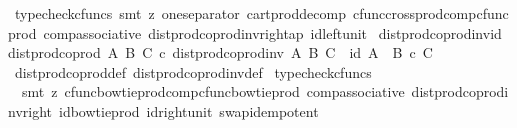 \begin{isabellebody}
\isamarkupfalse%
\ {\isacharparenleft}{\kern0pt}typecheck{\isacharunderscore}{\kern0pt}cfuncs{\isacharcomma}{\kern0pt}\ smt\ {\isacharparenleft}{\kern0pt}z{}{\isacharparenright}{\kern0pt}\ one{\isacharunderscore}{\kern0pt}separator\ cart{\isacharunderscore}{\kern0pt}prod{\isacharunderscore}{\kern0pt}decomp\ cfunc{\isacharunderscore}{\kern0pt}cross{\isacharunderscore}{\kern0pt}prod{\isacharunderscore}{\kern0pt}comp{\isacharunderscore}{\kern0pt}cfunc{\isacharunderscore}{\kern0pt}prod\ comp{\isacharunderscore}{\kern0pt}associative{}\ dist{\isacharunderscore}{\kern0pt}prod{\isacharunderscore}{\kern0pt}coprod{\isacharunderscore}{\kern0pt}inv{}{\isacharunderscore}{\kern0pt}right{\isacharunderscore}{\kern0pt}ap\ id{\isacharunderscore}{\kern0pt}left{\isacharunderscore}{\kern0pt}unit{}{\isacharparenright}{\kern0pt}%
\endisatagproof
{\isafoldproof}%
%
\isadelimproof
\isanewline
%
\endisadelimproof
\isanewline
{}\isamarkupfalse%
\ dist{\isacharunderscore}{\kern0pt}prod{\isacharunderscore}{\kern0pt}coprod{}{\isacharunderscore}{\kern0pt}inv{}{\isacharunderscore}{\kern0pt}id{\isacharcolon}{\kern0pt}\isanewline
{\isachardoublequoteopen}dist{\isacharunderscore}{\kern0pt}prod{\isacharunderscore}{\kern0pt}coprod{}\ A\ B\ C\ {\isasymcirc}\isactrlsub c\ dist{\isacharunderscore}{\kern0pt}prod{\isacharunderscore}{\kern0pt}coprod{\isacharunderscore}{\kern0pt}inv{}\ A\ B\ C\ {\isacharequal}{\kern0pt}\ id\ {\isacharparenleft}{\kern0pt}{\isacharparenleft}{\kern0pt}A\ {\isasymCoprod}\ B{\isacharparenright}{\kern0pt}\ {\isasymtimes}\isactrlsub c\ C{\isacharparenright}{\kern0pt}{\isachardoublequoteclose}\isanewline
%
\isadelimproof
\ \ %
\endisadelimproof
%
\isatagproof
{}\isamarkupfalse%
\ dist{\isacharunderscore}{\kern0pt}prod{\isacharunderscore}{\kern0pt}coprod{}{\isacharunderscore}{\kern0pt}def\ dist{\isacharunderscore}{\kern0pt}prod{\isacharunderscore}{\kern0pt}coprod{\isacharunderscore}{\kern0pt}inv{}{\isacharunderscore}{\kern0pt}def\ \isamarkupfalse%
{\isacharparenleft}{\kern0pt}{\isacharminus}{\kern0pt}{\isacharcomma}{\kern0pt}typecheck{\isacharunderscore}{\kern0pt}cfuncs{\isacharcomma}{\kern0pt}\isanewline
\ \ smt\ {\isacharparenleft}{\kern0pt}z{}{\isacharparenright}{\kern0pt}\ cfunc{\isacharunderscore}{\kern0pt}bowtie{\isacharunderscore}{\kern0pt}prod{\isacharunderscore}{\kern0pt}comp{\isacharunderscore}{\kern0pt}cfunc{\isacharunderscore}{\kern0pt}bowtie{\isacharunderscore}{\kern0pt}prod\ comp{\isacharunderscore}{\kern0pt}associative{}\ dist{\isacharunderscore}{\kern0pt}prod{\isacharunderscore}{\kern0pt}coprod{\isacharunderscore}{\kern0pt}inv{\isacharunderscore}{\kern0pt}right\ id{\isacharunderscore}{\kern0pt}bowtie{\isacharunderscore}{\kern0pt}prod\ id{\isacharunderscore}{\kern0pt}right{\isacharunderscore}{\kern0pt}unit{}\ swap{\isacharunderscore}{\kern0pt}idempotent{\isacharparenright}{\kern0pt}%

\end{isabellebody}
